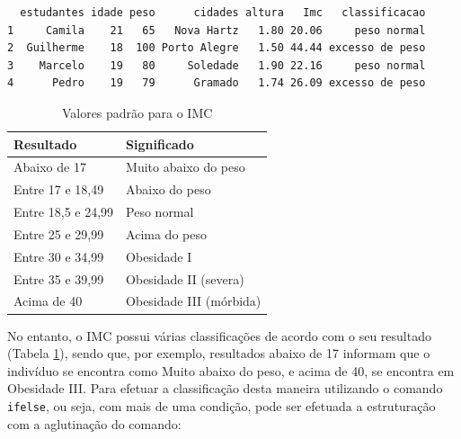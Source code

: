 \documentclass[12pt,portuguese,oneside]{book}
\begin{document}
\begin{verbatim}
  estudantes idade peso      cidades altura   Imc   classificacao
1     Camila    21   65   Nova Hartz   1.80 20.06     peso normal
2  Guilherme    18  100 Porto Alegre   1.50 44.44 excesso de peso
3    Marcelo    19   80     Soledade   1.90 22.16     peso normal
4      Pedro    19   79      Gramado   1.74 26.09 excesso de peso
\end{verbatim}

\begin{table}

\caption{\label{tab:imct}Valores padrão para o IMC}
\centering
\begin{tabular}[t]{l|l}
\hline
Resultado & Significado\\
\hline
Abaixo de 17 & Muito abaixo do peso\\
\hline
Entre 17 e 18,49 & Abaixo do peso\\
\hline
Entre 18,5 e 24,99 & Peso normal\\
\hline
Entre 25 e 29,99 & Acima do peso\\
\hline
Entre 30 e 34,99 & Obesidade I\\
\hline
Entre 35 e 39,99 & Obesidade II (severa)\\
\hline
Acima de 40 & Obesidade III (mórbida)\\
\hline
\end{tabular}
\end{table}

No entanto, o IMC possui várias classificações de acordo com o seu
resultado (Tabela \ref{tab:imct}), sendo que, por exemplo, resultados
abaixo de 17 informam que o indivíduo se encontra como Muito abaixo do
peso, e acima de 40, se encontra em Obesidade III. Para efetuar a
classificação desta maneira utilizando o comando \texttt{ifelse}, ou
seja, com mais de uma condição, pode ser efetuada a estruturação com a
aglutinação do comando:
\end{document}
